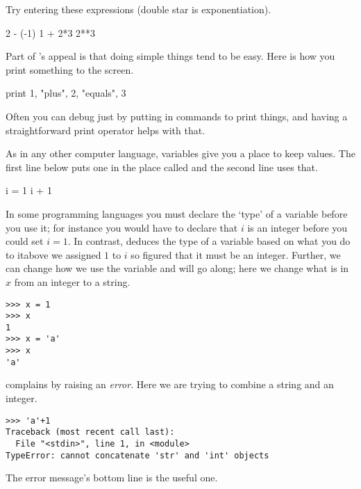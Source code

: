 Try entering these expressions (double star is exponentiation).
\begin{pythonoutput}
2 - (-1)
1 + 2*3
2**3  
\end{pythonoutput}

Part of \python's appeal is that doing simple things tend to be easy.
Here is how you print something to the screen.
\begin{pythonoutput}
print 1, "plus", 2, "equals", 3
\end{pythonoutput}
Often you can debug just by putting in commands to print things, 
and having a straightforward print operator helps with that. 

As in any other computer language, variables give you a place to keep values.
The first line below puts one in the place called 
and the second line uses that.
\begin{pythonoutput}
i = 1
i + 1
\end{pythonoutput}
In some programming languages you must declare the `type' of a variable
before you use it; for instance you would have to declare 
that $i$ is an integer before you could set $i=1$.
In contrast, \python{} deduces the type of a variable 
based on what you do to it\Dash above we assigned $1$ to $i$ 
so \python{} figured that it must be an integer.
Further, we can change how we use the variable and \python{} will 
go along; here we change what is in $x$ from an integer to a string.
\begin{lstlisting}[style=python]
>>> x = 1
>>> x
1
>>> x = 'a'
>>> x
'a'
\end{lstlisting}

\python{} complains by raising an \textit{error}.
Here we are trying to combine a string and an integer. 
\begin{lstlisting}[style=python]
>>> 'a'+1
Traceback (most recent call last):
  File "<stdin>", line 1, in <module>
TypeError: cannot concatenate 'str' and 'int' objects
\end{lstlisting}
The error message's bottom line is the useful one.

